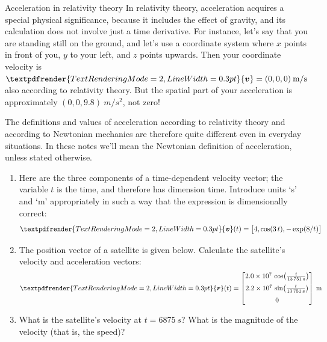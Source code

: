 \documentclass[a4paper,12pt,%
onecolumn,oneside,titlepage,%
british%
]{memoir}
\renewcommand*{\bm}[1]{\textpdfrender{TextRenderingMode=2,LineWidth=0.3pt}{\boldsymbol{#1}}}
\renewcommand*{\|}[1][]{\nonscript\:#1\vert\nonscript\:\mathopen{}}
\newcommand*{\yr}{\bm{r}}
\newcommand*{\yv}{\bm{v}}
\begin{document}
\begin{extra}{Acceleration in relativity theory}
  In relativity theory, acceleration acquires a special physical significance, because it includes the effect of gravity, and its calculation does not involve just a time derivative. For instance, let's say that you are standing still on the ground, and let's use a coordinate system where $x$ points in front of you, $y$ to your left, and $z$ points upwards. Then your coordinate velocity is $\yv=(0,0,0)\:\unit{m/s}$ also according to relativity theory. But the spatial part of your acceleration is approximately $(0,0,9.8)\:\unit{m/s^{2}}$, not zero!

  The definitions and values of acceleration according to relativity theory and according to Newtonian mechanics are therefore quite different even in everyday situations. In these notes we'll mean the Newtonian definition of acceleration, unless stated otherwise.
\end{extra}

\medskip

\begin{exercise}
  \begin{enumerate}[exerc]
  \item Here are the three components of a time-dependent velocity vector; the variable $t$ is the time, and therefore has dimension \textsf{time}. Introduce units \enquote*{\unit{s}} and \enquote*{\unit{m}} appropriately in such a way that the expression is dimensionally correct:
    \begin{equation*}
      \bm{v}(t) = \bigl[4, \cos(3\,t), -\exp(8/t)\bigr]
    \end{equation*}
  \item The position vector of a satellite is given below. Calculate the satellite's velocity and acceleration vectors:
    \begin{equation*}
      \yr(t) =
      \begin{bmatrix}
        \num[exponent-mode=scientific]{20e+6}\,
        \cos\bigl(\frac{t}{\qty{13751}{s}}\bigr)\\[2\jot]
        \num[exponent-mode=scientific]{22e+6}\,
        \sin\bigl(\frac{t}{\qty{13751}{s}}\bigr)\\[2\jot]
        \num{0}
      \end{bmatrix}\:\unit{m}
    \end{equation*}
  \item What is the satellite's velocity at $t=\qty{6875}{s}$? What is the magnitude of the velocity (that is, the speed)?
  \end{enumerate}
\end{exercise}
\end{document}
